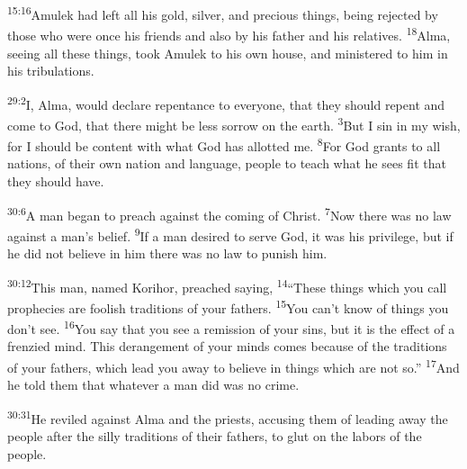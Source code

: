 \documentclass[openany,12pt,english]{book}
\newenvironment{para}{\par\pretolerance=100\tolerance=200\setlength{\emergencystretch}{0.6em}\relax}{\par}
\begin{document}
\begin{para}
    \textsuperscript{15:16}\thinspace{}Am\-u\-lek had left all his gold, sil\-ver, and pre\-cious things, be\-ing rejected by those who were once his friends and al\-so by his fa\-ther and his relatives.
    \textsuperscript{18}\thinspace{}Al\-ma, see\-ing all these things, took Am\-u\-lek to his own house, and ministered to him in his tribulations.
\end{para}

\bigskip{}

\begin{para}
    \textsuperscript{29:2}\thinspace{}I, Al\-ma, would de\-clare re\-pent\-ance to eve\-ry\-one, that they should re\-pent and come to God, that there might be less sor\-row on the earth.
    \textsuperscript{3}\thinspace{}But I sin in my wish, for I should be con\-tent with what God has al\-lot\-ted me.
    \textsuperscript{8}\thinspace{}For God grants to all nations, of their own na\-tion and lan\-guage, peo\-ple to teach what he sees fit that they should have.
\end{para}

\bigskip{}

\begin{para}
    \textsuperscript{30:6}\thinspace{}A man be\-gan to preach a\-gainst the com\-ing of Christ.
    \textsuperscript{7}\thinspace{}Now there was no law a\-gainst a man's be\-lief.
    \textsuperscript{9}\thinspace{}If a man de\-sired to serve God, it was his priv\-i\-lege, but if he did not be\-lieve in him there was no law to pun\-ish him.
\end{para}

\begin{para}
    \textsuperscript{30:12}\thinspace{}This man, named Kor\-i\-hor, preached say\-ing,
    \textsuperscript{14}\thinspace{}“These things which you call prophecies are fool\-ish traditions of your fathers.
    \textsuperscript{15}\thinspace{}You can't know of things you don't see.
    \textsuperscript{16}\thinspace{}You say that you see a re\-mis\-sion of your sins, but it is the ef\-fect of a fren\-zied mind. This de\-range\-ment of your minds co\-mes be\-cause of the traditions of your fathers, which lead you a\-way to be\-lieve in things which are not so.”
    \textsuperscript{17}\thinspace{}And he told them that what\-ev\-er a man did was no crime.
\end{para}

\begin{para}
    \textsuperscript{30:31}\thinspace{}He re\-viled a\-gainst Al\-ma and the priests, ac\-cus\-ing them of lead\-ing a\-way the peo\-ple af\-ter the sil\-ly traditions of their fathers, to glut on the labors of the peo\-ple.
\end{para}
\end{document}
